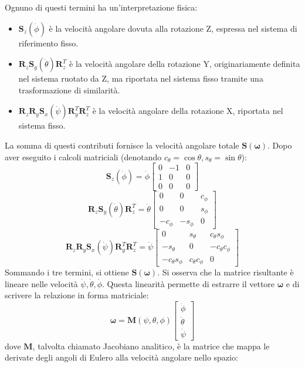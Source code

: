 ﻿\documentclass[11pt, a4paper]{article}
\begin{document}
Ognuno di questi termini ha un'interpretazione fisica:
\begin{itemize}
    \item \(\bm{S}_z(\dot{\phi})\) è la velocità angolare dovuta alla rotazione Z, espressa nel sistema di riferimento fisso.
    \item \(\bm{R}_z \bm{S}_y(\dot{\theta}) \bm{R}_z^T\) è la velocità angolare della rotazione Y, originariamente definita nel sistema ruotato da Z, ma riportata nel sistema fisso tramite una trasformazione di similarità.
    \item \(\bm{R}_z\bm{R}_y \bm{S}_x(\dot{\psi}) \bm{R}_y^T\bm{R}_z^T\) è la velocità angolare della rotazione X, riportata nel sistema fisso.
\end{itemize}
La somma di questi contributi fornisce la velocità angolare totale \(\bm{S}(\bm{\omega})\). Dopo aver eseguito i calcoli matriciali (denotando \(c_\theta = \cos\theta, s_\theta = \sin\theta\)):
\[
    \bm{S}_z(\dot{\phi}) = \dot{\phi} \begin{bmatrix} 0 & -1 & 0 \\ 1 & 0 & 0 \\ 0 & 0 & 0 \end{bmatrix}
\]
\[
    \bm{R}_z \bm{S}_y(\dot{\theta}) \bm{R}_z^T = \dot{\theta} \begin{bmatrix} 0 & 0 & c_{\phi} \\ 0 & 0 & s_{\phi} \\ -c_{\phi} & -s_{\phi} & 0 \end{bmatrix}
\]
\[
    \bm{R}_z\bm{R}_y \bm{S}_x(\dot{\psi}) \bm{R}_y^T\bm{R}_z^T = \dot{\psi} \begin{bmatrix} 0 & s_{\theta} & c_{\theta}s_{\phi} \\ -s_{\theta} & 0 & -c_{\theta}c_{\phi} \\ -c_{\theta}s_{\phi} & c_{\theta}c_{\phi} & 0 \end{bmatrix}
\]
Sommando i tre termini, si ottiene \(\bm{S}(\bm{\omega})\). Si osserva che la matrice risultante è lineare nelle velocità \(\dot{\psi}, \dot{\theta}, \dot{\phi}\). Questa linearità permette di estrarre il vettore \(\bm{\omega}\) e di scrivere la relazione in forma matriciale:
\[
    \bm{\omega} = \bm{M}(\psi, \theta, \phi)
    \begin{bmatrix}
        \dot{\phi} \\
        \dot{\theta} \\
        \dot{\psi}
    \end{bmatrix}
\]
dove \(\bm{M}\), talvolta chiamato Jacobiano analitico, è la matrice che mappa le derivate degli angoli di Eulero alla velocità angolare nello spazio:
\end{document}
